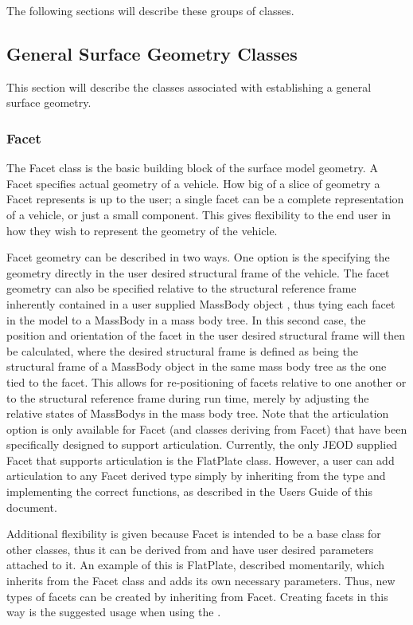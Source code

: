 The following sections will describe these groups of classes.

\subsection{General Surface Geometry Classes}

This section will describe the classes associated with establishing a general
surface geometry.

\subsubsection{Facet}

The Facet class is the basic building block of the surface model geometry.
A Facet specifies actual geometry of a vehicle. How big of a slice of geometry
a Facet represents is up to the user; a single
facet can be a complete representation of a
vehicle, or just a small component. This gives flexibility to the end user in how
they wish to represent the geometry of the vehicle.

Facet geometry can be described in two ways. One option is the specifying the
geometry directly in the user desired structural frame of the vehicle.
The facet geometry can also be
specified relative to the structural reference frame inherently contained
in a user supplied MassBody object \cite{dynenv:MASS}, thus tying
each facet in the model to a MassBody in a mass body tree. In this second case,
the position and orientation of the facet in the user desired structural frame
will then be calculated, where the desired structural frame is
defined as being the structural frame of a MassBody object in the same
mass body tree as the one tied to the facet. This allows for re-positioning
of facets relative to one another or to the structural reference frame during run time,
merely by adjusting the relative states of MassBodys in the mass body tree.
Note that the articulation option is only available for Facet (and classes
deriving from Facet) that have been specifically designed to support
articulation. Currently, the only JEOD supplied Facet that supports
articulation is the FlatPlate class. However, a user can
add articulation to any Facet derived type
simply by inheriting from the type and implementing the
correct functions, as described in the Users Guide of this
document.

Additional flexibility is
given because Facet is intended to be a base class for other classes, thus
it can be derived from and have user desired parameters attached to it. An
example of this is FlatPlate, described momentarily, which inherits from
the Facet class and adds its own necessary parameters. Thus, new types
of facets can be created by inheriting from Facet. Creating facets in
this way is the suggested usage when using the
\ModelDesc.

